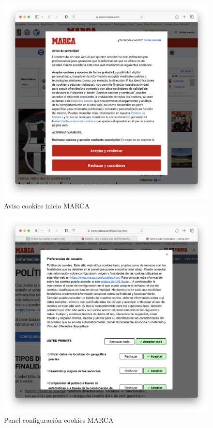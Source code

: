\begin{figure}[H]   
    \includegraphics[width=15cm]{cookies_marca.png}
    \caption{Aviso cookies inicio MARCA}
    \label{fig:cookies_marca}
\end{figure}

\begin{figure}[H]   
    \includegraphics[width=15cm]{panel_cookies_marca.png}
    \caption{Panel configuración cookies MARCA}
    \label{fig:panel_cookies_marca}
\end{figure}

